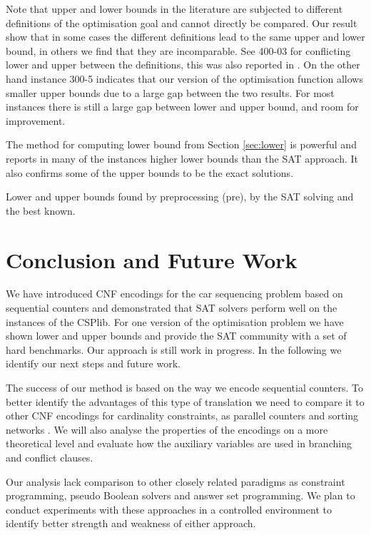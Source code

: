 \documentclass[]{llncs}
\begin{document}
Note that upper and lower bounds in the literature are subjected to different definitions of the optimisation goal and
cannot directly be compared. Our result show that in some cases the different definitions lead to the same upper and
lower bound, in others we find that they are incomparable. See 400-03 for conflicting lower and upper between the
definitions, this was also reported in \cite{Estellon06}. On the other hand instance 300-5 indicates that our version of
the optimisation function allows smaller upper bounds due to a large gap between the two results. For most instances
there is still a large gap between lower and upper bound, and room for improvement. 

The method for computing lower bound from Section \ref{sec:lower} is powerful and reports in many of the instances
higher lower bounds than the SAT approach. It also confirms some of the upper bounds to be the exact solutions. 

\begin{table}[htbp]
    \caption{Lower and upper bounds found by preprocessing (pre), by the SAT solving and the best known.}
    \centering
    
    \label{tab:3}
\end{table}

\section{Conclusion and Future Work}

We have introduced CNF encodings for the car sequencing problem based on sequential counters and demonstrated that SAT
solvers perform well on the instances of the CSPlib. For one version of the optimisation problem we have shown lower and
upper bounds and provide the SAT community with a set of hard benchmarks. Our approach is still work in progress. In the
following we identify our next steps and future work. 

The success of our method is based on the way we encode sequential counters. To better identify the advantages of this
type of translation we need to compare it to other CNF encodings for cardinality constraints, as parallel counters and
sorting networks \cite{Sinz05}\cite{Een06}. We will also analyse the properties of the encodings on a more theoretical
level and evaluate how the auxiliary variables are used in branching and conflict clauses. 

Our analysis lack comparison to other closely related paradigms as constraint programming, pseudo Boolean solvers and
answer set programming.  We plan to conduct experiments with these approaches in a controlled environment to identify
better strength and weakness of either approach. 
\end{document}
